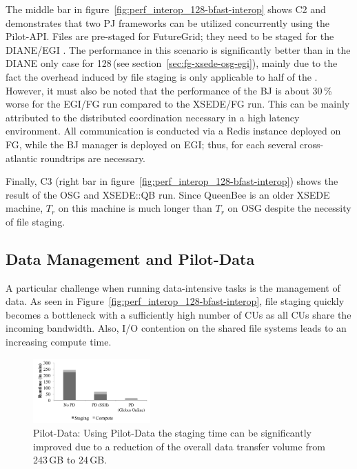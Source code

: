\documentclass[conference]{IEEEtran}
\begin{document}


The middle bar in figure~\ref{fig:perf_interop_128-bfast-interop}
shows C2 and demonstrates that two PJ frameworks can be utilized
concurrently using the Pilot-API. Files are pre-staged for FutureGrid;
they need to be staged for the DIANE/EGI \cus. The performance in this
scenario is significantly better than in the DIANE only case for
128\,\cus (see section~\ref{sec:fg-xsede-osg-egi}), mainly due to the
fact the overhead induced by file staging is only applicable to half
of the \cus. However, it must also be noted that the performance of
the BJ \pilot is about 30\,\% worse for the EGI/FG run compared to the
XSEDE/FG run.  This can be mainly attributed to the distributed
coordination necessary in a high latency environment. All
communication is conducted via a Redis instance deployed on FG, while
the BJ manager is deployed on EGI; thus, for each \cu several
cross-atlantic roundtrips are necessary.

Finally, C3 (right bar in figure~\ref{fig:perf_interop_128-bfast-interop})
shows the result of the OSG and XSEDE::QB run. Since QueenBee is an older
XSEDE machine, $T_r$ on this machine is much longer than $T_r$ on OSG despite
the necessity of file staging.

\subsection{Data Management and Pilot-Data}
\label{sec:experiment-pilotdata}

A particular challenge when running data-intensive tasks is the management of
data. As seen in Figure~\ref{fig:perf_interop_128-bfast-interop}, file staging
quickly becomes a bottleneck with a sufficiently high number of CUs as all CUs
share the incoming bandwidth. Also, I/O contention on the shared file systems
leads to an increasing compute time.

\begin{figure}[htbp]
	\centering
		\includegraphics[width=0.4\textwidth]{../perf/sc/pd-128cus.pdf}
	\caption{Pilot-Data: Using Pilot-Data the staging time can be 
	significantly improved due to a reduction of the overall data transfer volume from 243\,GB to 24\,GB.}
	\label{fig:perf_sc_download-concurrent-cus}
\end{figure}
\end{document}
